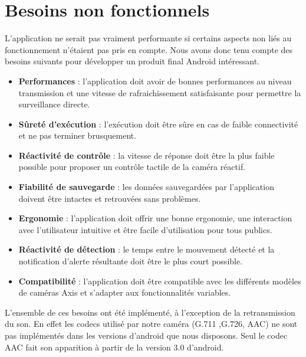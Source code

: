 \section{Besoins non fonctionnels}
L'application ne serait pas vraiment performante si certains aspects non liés au fonctionnement n'étaient pas pris en compte. Nous avons donc tenu compte des besoins suivants pour développer un produit final Android intéressant.
\begin{itemize}
  \item \textbf{Performances} : l'application doit avoir de bonnes performances au
  niveau transmission et une vitesse de rafraichissement satisfaisante pour permettre la surveillance directe.
  \item \textbf{Sûreté d'exécution} : l'exécution doit être sûre en cas de faible
  connectivité et ne pas terminer brusquement.
  \item \textbf{Réactivité de contrôle} : la vitesse de réponse doit être la plus
  faible possible pour proposer un contrôle tactile de la caméra réactif.
  \item \textbf{Fiabilité de sauvegarde} : les données sauvegardées par
  l'application doivent être intactes et retrouvées sans problèmes.
  \item \textbf{Ergonomie} : l'application doit offrir une bonne ergonomie, une
  interaction avec l'utilisateur intuitive et être facile d'utilisation pour tous publics.
  \item \textbf{Réactivité de détection} : le temps entre le mouvement détecté et
  la notification d'alerte résultante doit être le plus court possible.
  \item \textbf{Compatibilité} : l'application doit être compatible avec les
  différents modèles de caméras Axis et s'adapter aux fonctionnalités variables.
\end{itemize}
L'ensemble de ces besoins ont été implémenté, à l'exception de la retransmission
du son. En effet les codecs utilisé par notre caméra (G.711 ,G.726, AAC) ne sont
pas implémentés dans les versions d'android que nous disposons. Seul le codec AAC fait son
apparition à partir de la version 3.0 d'android.
\clearpage